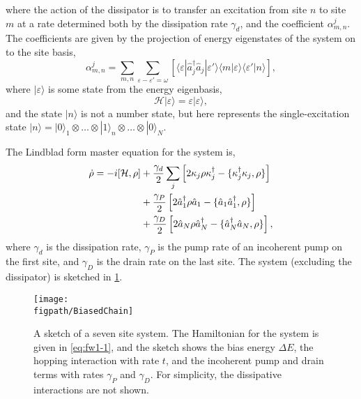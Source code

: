 where the action of the dissipator is to transfer an excitation from site \(n\) to site \(m\) at a rate determined both by the dissipation rate \(\gamma_{d}\), and the coefficient \(\alpha_{m,n}^{j}\). The coefficients are given by the projection of energy eigenstates of the system on to the site basis,
\begin{equation}
	\alpha_{m,n}^{j} = \sum_{m,n} \sum_{\varepsilon - \varepsilon' = \omega} \left[ \langle \varepsilon | \hat{a}_{j}^{\dagger}\hat{a}_{j} | \varepsilon' \rangle \langle m |\varepsilon \rangle \langle \varepsilon' | n \rangle \right], 
	\label{eq:fw1-6}
\end{equation}
where \(|\varepsilon \rangle\) is some state from the energy eigenbasis,
\begin{equation}
	\mathcal{H}|\varepsilon \rangle = \varepsilon|\varepsilon\rangle,
	\label{eq:fw1-7}
\end{equation}
and the state \(|n\rangle\) is not a number state, but here represents the single-excitation state \(|n \rangle = | 0 \rangle_{1} \otimes \ldots \otimes | 1 \rangle_{n} \otimes \ldots \otimes |0 \rangle_{N}\). 

The Lindblad form master equation for the system is, 
\begin{align}
	\dot{\rho} = -i[\mathcal{H}, \rho] &+ \frac{\gamma_{d}}{2} \sum_{j} \left[2\kappa_{j}\rho\kappa_{j}^{\dagger} - \{\kappa_{j}^{\dagger}\kappa_{j}, \rho\}\right] \notag \\
	&+ \frac{\gamma_{P}}{2}\left[2\hat{a}_{1}^{\dagger}\rho\hat{a}_{1} - \{\hat{a}_{1}\hat{a}_{1}^{\dagger}, \rho\}\right] \notag \\
	&+ \frac{\gamma_{D}}{2}\left[2\hat{a}_{N}\rho\hat{a}_{N}^{\dagger} - \{\hat{a}_{N}^{\dagger}\hat{a}_{N}, \rho\}\right],
	\label{eq:fw1-2}
\end{align}
where \(\gamma_{d}\) is the dissipation rate, \(\gamma_{P}\) is the pump rate of an incoherent pump on the first site, and \(\gamma_{D}\) is the drain rate on the last site. The system (excluding the dissipator) is sketched in \cref{fig:fw1-1}.

\begin{figure}[ht!]
	\centering
	\texttt{[image: \\figpath/BiasedChain]}
	\caption{\label{fig:fw1-1}A sketch of a seven site system. The Hamiltonian for the system is given in \cref{eq:fw1-1}, and the sketch shows the bias energy \(\Delta E\), the hopping interaction with rate \(t\), and the incoherent pump and drain terms with rates \(\gamma_{P}\) and \(\gamma_{D}\). For simplicity, the dissipative interactions are not shown.}
\end{figure}

